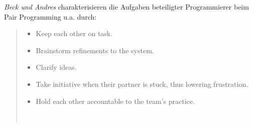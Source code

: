 \noindent
\textit{Beck und Andres} charakterisieren die Aufgaben beteiligter Programmierer beim Pair Programming u.a. durch:

\blockquote[{~\cite[42]{BA04}}]{
    \begin{itemize}
        \item Keep each other on task.
        \item Brainstorm refinements to the system.
        \item Clarify ideas.
        \item Take initiative when their partner is stuck, thus lowering frustration.
        \item Hold each other accountable to the team's practice.
    \end{itemize}
}
